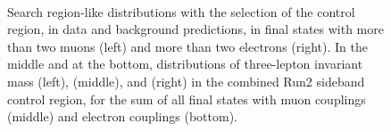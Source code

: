 \begin{figure}[h]
\noindent
  \\
  \caption{Search region-like distributions with the selection of the
    \PQb control region, in data and background
    predictions, in final states with more than two muons (left) and
    more than two electrons (right). In the middle and at the bottom, distributions of three-lepton invariant mass (left), \mtwol
    (middle), and \Deltwod (right) in the combined Run2 sideband control region,
    for the sum of all final states with muon couplings (middle) and
    electron couplings (bottom).}
  \label{fig:sb_ttbar_Ctrl}
\end{figure}


